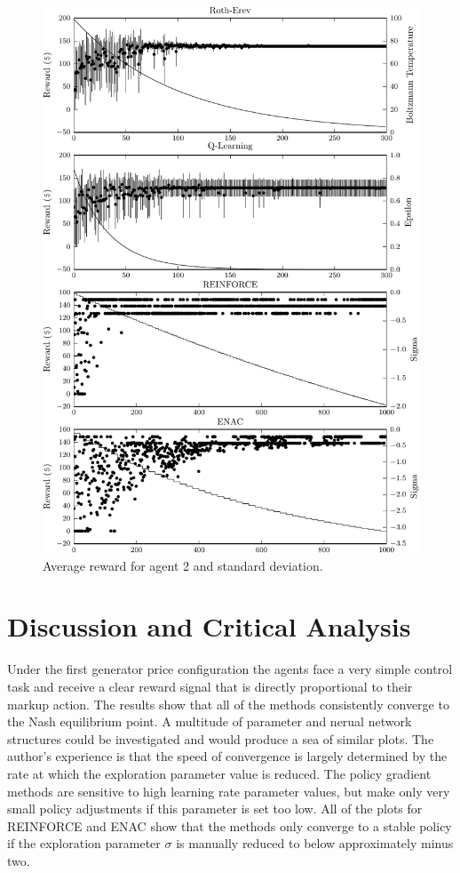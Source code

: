 \begin{figure}
  \centering
  \includegraphics{figures/fig5_2_reward_a2}
  \caption{Average reward for agent 2 and standard deviation.}
  \label{fig:5_2_reward_a2}
\end{figure}

\section{Discussion and Critical Analysis}
Under the first generator price configuration the agents face a very simple
control task and receive a clear reward signal that is directly proportional to
their markup action.  The results show that all of the methods consistently
converge to the Nash equilibrium point.  A multitude of parameter and nerual
network structures could be investigated and would produce a sea of similar
plots.  The author's experience is that the speed of convergence is largely
determined by the rate at which the exploration parameter value is reduced.
The policy gradient methods are sensitive to high learning rate parameter
values, but make only very small policy adjustments if this parameter is set
too low. All of the plots for REINFORCE and ENAC show that the methods only converge to a
stable policy if the exploration parameter $\sigma$ is manually reduced to
below approximately minus two.

